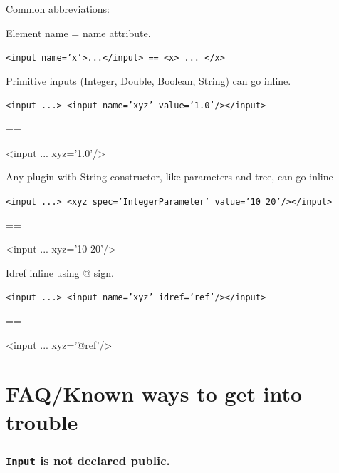 \documentclass{article}
\begin{document}
Common abbreviations:


Element name = name attribute.

{\color{blue}\tt <input name='x'>...</input> == <x> ... </x>}

Primitive inputs (Integer, Double, Boolean, String) can go inline.

{\color{blue}\tt <input ...> <input name='xyz' value='1.0'/></input> 

== 

<input ... xyz='1.0'/>}

Any plugin with String constructor, like parameters and tree, can go inline

{\color{blue}\tt <input ...> <xyz spec='IntegerParameter' value='10 20'/></input> 

== 

<input ... xyz='10 20'/>}

Idref inline using @ sign.

{\color{blue}\tt <input ...> <input name='xyz' idref='ref'/></input> 

== 

<input ... xyz='@ref'/>}










\section{FAQ/Known ways to get into trouble\label{sec.faq}}

\subsubsection{{\tt Input} is not declared public.}
\end{document}
